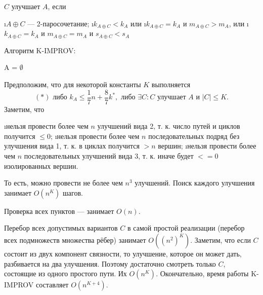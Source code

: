 $C$ улучшает $A$, если 
\begin{enumerate}[label=\protect\circled{{\arabic*}}]
	\i $A \oplus C$ --- 2-паросочетание;
	\i $k_{A \oplus C} < k_A$ или
	\i $k_{A \oplus C} = k_A$ и $m_{A \oplus C} > m_A$, или
	\i $k_{A \oplus C} = k_A$ и $m_{A \oplus C} = m_A$ и $s_{A \oplus C} < s_A$
\end{enumerate}

Алгоритм K-IMPROV:

\begin{algorithm}[H]
 A = $\emptyset$\;
\end{algorithm}

Предположим, что для некоторой константы $K$ выполняется 
$$(*) \text{ либо } k_A \le \frac{1}{7}n+\frac{8}{7}k^*, \text{ либо } \exists C: C \text{ улучшает } A \textbf{ и } |C|\le K.$$
Заметим, что
\begin{itemize}
 \i нельзя провести более чем $n$ улучшений вида 2, т. к. число путей и циклов получится $\le0$;
 \i нельзя провести более чем $n$ последовательных подряд без улучшения вида 1, т. к. в циклах получится $>n$ вершин;
 \i нельзя провести более чем $n$ последовательных улучшений вида 3, т. к. иначе будет $<= 0$ изолированных вершин. 
\end{itemize}
То есть, можно провести не более чем $n^3$ улучшений. Поиск каждого улучшения занимает $O(n^K)$ шагов.

Проверка всех пунктов  ---  занимает $O(n)$.

Перебор всех допустимых вариантов $C$ в самой простой реализации (перебор всех подмножеств множества рёбер) занимает $O((n^2)^K)$. Заметим, что если $C$ состоит из двух компонент связности, то улучшение, которое он может дать, разбивается на два улучшения. Поэтому достаточно смотреть только $C$, состоящие из одного простого пути. Их $O(n^K)$. Окончательно, время работы K-IMPROV составляет $O(n^{K+4})$.

